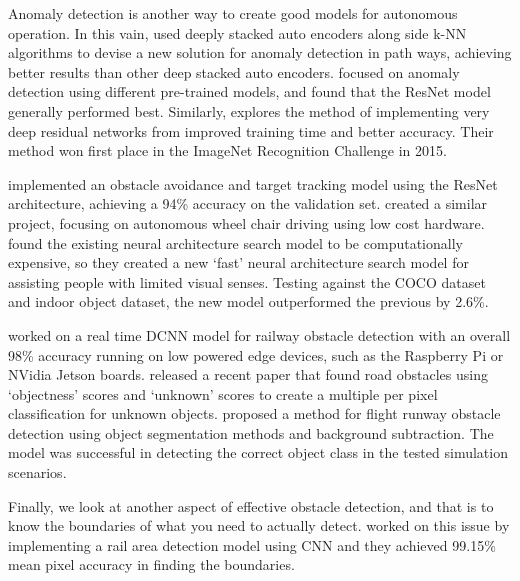 \documentclass[stu,12pt,floatsintext]{apa7}
\begin{document}
Anomaly detection is another way to create good models for autonomous operation. In this vain, \textcite{dairi_obstacle_2018} used deeply stacked auto encoders along side k-NN algorithms to devise a new solution for anomaly detection in path ways, achieving better results than other deep stacked auto encoders. \textcite{wenning_anomaly_2022} focused on anomaly detection using different pre-trained models, and found that the ResNet model generally performed best. Similarly, \textcite{he_deep_2016} explores the method of implementing very deep residual networks from improved training time and better accuracy. Their method won first place in the ImageNet Recognition Challenge in 2015.

\textcite{fang_computer_2021} implemented an obstacle avoidance and target tracking model using the ResNet architecture, achieving a 94\% accuracy on the validation set. \textcite{farheen_object_2022} created a similar project, focusing on autonomous wheel chair driving using low cost hardware. \textcite{said_obstacle_2023} found the existing neural architecture search model to be computationally expensive, so they created a new `fast' neural architecture search model for assisting people with limited visual senses. Testing against the COCO dataset and indoor object dataset, the new model outperformed the previous by 2.6\%.

\textcite{jenefa_real-time_2023} worked on a real time DCNN model for railway obstacle detection with an overall 98\% accuracy running on low powered edge devices, such as the Raspberry Pi or NVidia Jetson boards. \textcite{noguchi_road_2024} released a recent paper that found road obstacles using `objectness' scores and `unknown' scores to create a multiple per pixel classification for unknown objects. \textcite{andreev_runway_2021} proposed a method for flight runway obstacle detection using object segmentation methods and background subtraction. The model was successful in detecting the correct object class in the tested simulation scenarios.

Finally, we look at another aspect of effective obstacle detection, and that is to know the boundaries of what you need to actually detect. \textcite{wang_efficient_2018} worked on this issue by implementing a rail area detection model using CNN and they achieved 99.15\% mean pixel accuracy in finding the boundaries.
\end{document}
